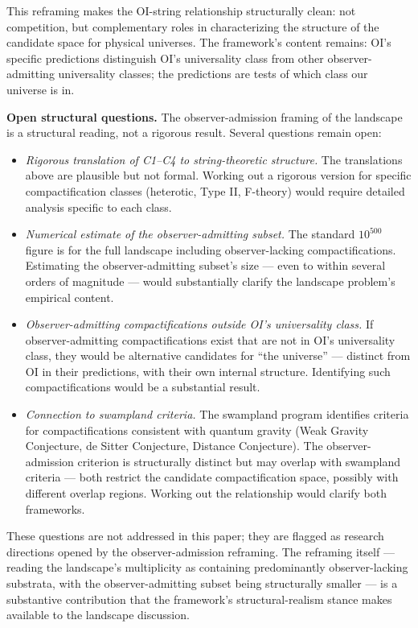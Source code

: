 \documentclass[
]{article}
\begin{document}
This reframing makes the OI-string relationship structurally clean: not
competition, but complementary roles in characterizing the structure of
the candidate space for physical universes. The framework's content
remains: OI's specific predictions distinguish OI's universality class
from other observer-admitting universality classes; the predictions are
tests of which class our universe is in.

\textbf{Open structural questions.} The observer-admission framing of
the landscape is a structural reading, not a rigorous result. Several
questions remain open:

\begin{itemize}
\item
  \emph{Rigorous translation of C1--C4 to string-theoretic structure.}
  The translations above are plausible but not formal. Working out a
  rigorous version for specific compactification classes (heterotic,
  Type II, F-theory) would require detailed analysis specific to each
  class.
\item
  \emph{Numerical estimate of the observer-admitting subset.} The
  standard \(10^{500}\) figure is for the full landscape including
  observer-lacking compactifications. Estimating the observer-admitting
  subset's size --- even to within several orders of magnitude --- would
  substantially clarify the landscape problem's empirical content.
\item
  \emph{Observer-admitting compactifications outside OI's universality
  class.} If observer-admitting compactifications exist that are not in
  OI's universality class, they would be alternative candidates for
  ``the universe'' --- distinct from OI in their predictions, with their
  own internal structure. Identifying such compactifications would be a
  substantial result.
\item
  \emph{Connection to swampland criteria.} The swampland program
  identifies criteria for compactifications consistent with quantum
  gravity (Weak Gravity Conjecture, de Sitter Conjecture, Distance
  Conjecture). The observer-admission criterion is structurally distinct
  but may overlap with swampland criteria --- both restrict the
  candidate compactification space, possibly with different overlap
  regions. Working out the relationship would clarify both frameworks.
\end{itemize}

These questions are not addressed in this paper; they are flagged as
research directions opened by the observer-admission reframing. The
reframing itself --- reading the landscape's multiplicity as containing
predominantly observer-lacking substrata, with the observer-admitting
subset being structurally smaller --- is a substantive contribution that
the framework's structural-realism stance makes available to the
landscape discussion.
\end{document}
